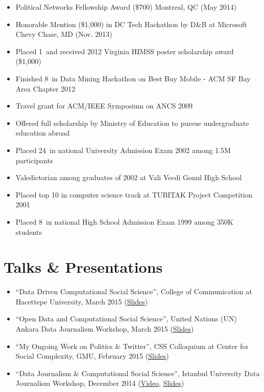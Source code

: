 \documentclass[11pt, letter]{article}
\begin{document}
\begin{raggedright}
\begin{itemize}
\itemsep1pt\parskip0pt
\item
  Political Networks Fellowship Award (\$700) Montreal, QC (May 2014)
\item
  Honorable Mention (\$1,000) in DC Tech Hackathon by D\&B at Microsoft
  Chevy Chase, MD (Nov. 2013)
\item
  Placed 1~and received 2012 Virginia HIMSS poster scholarship award
  (\$1,000)
\item
  Finished 8~in Data Mining Hackathon on Best Buy Mobile - ACM SF Bay
  Area Chapter 2012
\item
  Travel grant for ACM/IEEE Symposium on ANCS 2009
\item
  Offered full scholarship by Ministry of Education to pursue
  undergraduate education abroad
\item
  Placed 24~in national University Admission Exam 2002 among 1.5M
  participants
\item
  Valedictorian among graduates of 2002 at Vali Vecdi Gonul High School
\item
  Placed top 10 in computer science track at TUBITAK Project Competition
  2001
\item
  Placed 8~in national High School Admission Exam 1999 among 350K
  students
\end{itemize}

\section{Talks \& Presentations}\label{talks-presentations}

\begin{itemize}
\itemsep1pt\parskip0pt
\item
  ``Data Driven Computational Social Science'', College of Communication
  at Hacettepe University, March 2015
  (\href{https://docs.google.com/presentation/d/1yuHfA1NT70XV3GzIa6w_rTN_e8MwqN3yh6PQlqMR_FU}{Slides})
\item
  ``Open Data and Computational Social Science'', United Nations (UN)
  Ankara Data Journalism Workshop, March 2015
  (\href{https://docs.google.com/presentation/d/1GuInZz3N6_9isBn9QYaOMr15VgNiqgpj_Fh7k0iMboE}{Slides})
\item
  ``My Ongoing Work on Politics \& Twitter'', CSS Colloquium at Center
  for Social Complexity, GMU, February 2015
  (\href{http://www.slideshare.net/oztalha/toz-47802496}{Slides})
\item
  ``Data Journalism \& Computational Social Science'', Istanbul
  University Data Journalism Workshop, December 2014
  (\href{https://www.youtube.com/watch?v=ss7GeBDXJRE}{Video},
  \href{http://www.slideshare.net/oztalha/hesaplamali-sosyal-bilimler-veri-gazeteciligi}{Slides})
\end{itemize}


\end{raggedright}
\end{document}
